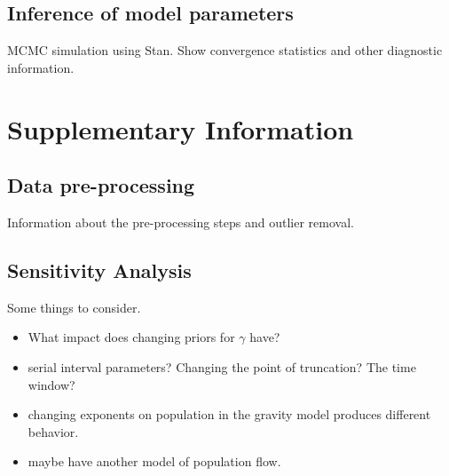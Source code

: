 \documentclass[a4paper,12pt]{article}
\begin{document}
\subsection{Inference of model parameters}

MCMC simulation using Stan.
Show convergence statistics and other diagnostic information.

\section{Supplementary Information}
\subsection{Data pre-processing}
Information about the pre-processing steps and outlier removal.
\subsection{Sensitivity Analysis}
Some things to consider.
\begin{itemize}
\item What impact does changing priors for $\gamma$ have?
\item serial interval parameters?
  Changing the point of truncation? The time window?
\item changing exponents on population in the gravity model produces
  different behavior.
 \item maybe have another model of population flow.  
\end{itemize}


\end{document}

